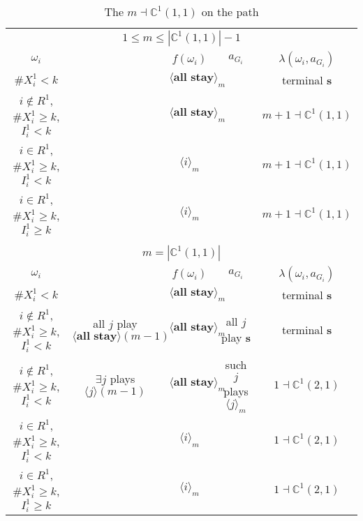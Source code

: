 \documentclass[12pt,letter]{article}
\newcommand{\Kappa}{\mathbb{C}}
\theoremstyle{definition}
\theoremstyle{remark}
\theoremstyle{claim}
\begin{document}
\begin{landscape}
\begin{table}[!htbp]
\caption{The $m\dashv\Kappa^1(1,1)$ on the path}
\label{table:eqm_path_k01}
\begin{center}
\begin{tabular}{c c | c | c | c }
\multicolumn{5}{c}{$1\leq m \leq |\Kappa^1(1,1)|-1$}\\
$\omega_i$ 	 & 	   &	$f(\omega_i)$  &	$a_{G_i}$ & $\lambda(\omega_i,a_{G_i})$ \\
\hline
\hline
$\# X^1_i<k$  	& 	 &$\langle \textbf{all stay} \rangle_m$ &	& terminal \textbf{s}\\
$i\notin R^1$, $\# X^1_i\geq k$, $I^1_i< k$  	&  &$\langle \textbf{all stay} \rangle_m$ & 	& $m+1\dashv\Kappa^1(1,1)$\\
$i\in R^1$, $\# X^1_i\geq k$, $I^1_i< k$  	& 	 &$\langle i \rangle_m$	&  & $m+1\dashv \Kappa^1(1,1)$\\
$i\in R^1$, $\# X^1_i\geq k$, $I^1_i\geq k$  	& 	 &$\langle i \rangle_m$	&  & $m+1\dashv \Kappa^1(1,1)$\\
\hline
\\
\multicolumn{5}{c}{$m=|\Kappa^1(1,1)|$}\\
$\omega_i$ 	 & 	   &	$f(\omega_i)$  &	$a_{G_i}$ & $\lambda(\omega_i,a_{G_i})$ \\
\hline
\hline
$\# X^1_i<k$  	& 	& $\langle \textbf{all stay} \rangle_m$	&     & terminal \textbf{s}\\
$i\notin R^1$, $\# X^1_i\geq k$, $I^1_i< k$   	& all $j$ play $\langle \textbf{all stay} \rangle(m-1)$ & $\langle \textbf{all stay} \rangle_m$	 & all $j$ play \textbf{s} & terminal \textbf{s}\\
$i\notin R^1$, $\# X^1_i\geq k$, $I^1_i< k$   	& $\exists j$ plays $\langle j \rangle(m-1)$ & $\langle \textbf{all stay} \rangle_m$	& such $j$ plays $\langle j \rangle_m$  & $1\dashv \Kappa^1(2,1)$\\
$i\in R^1$, $\# X^1_i\geq k$, $I^1_i< k$   	& 	& $\langle i \rangle_m$	&& $1\dashv \Kappa^1(2,1)$ \\
$i\in R^1$, $\# X^1_i\geq k$, $I^1_i\geq k$  	& 	& $\langle i \rangle_m$ &	& $1\dashv \Kappa^1(2,1)$ \\
\hline
\end{tabular}
\end{center}
\end{table}



\end{landscape}
\end{document}
